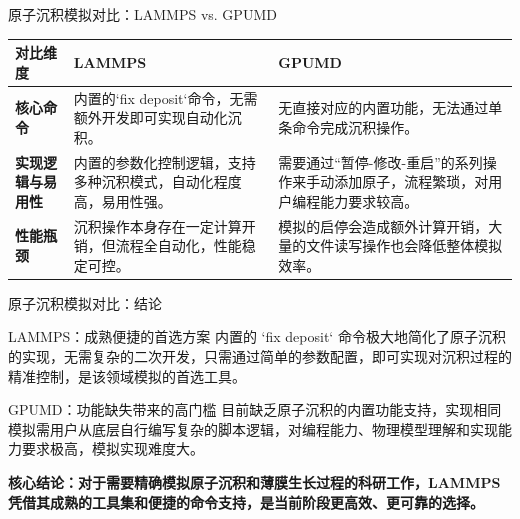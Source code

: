 \documentclass{beamer}
\begin{document}
\begin{frame}{原子沉积模拟对比：LAMMPS vs. GPUMD}
    \begin{tabular}{|l|l|l|}
        \hline
        \textbf{对比维度} & \textbf{LAMMPS} & \textbf{GPUMD} \\
        \hline
        \textbf{核心命令} & 内置的`fix deposit`命令，无需额外开发即可实现自动化沉积。 & 无直接对应的内置功能，无法通过单条命令完成沉积操作。 \\
        \hline
        \textbf{实现逻辑与易用性} & 内置的参数化控制逻辑，支持多种沉积模式，自动化程度高，易用性强。 & 需要通过“暂停-修改-重启”的系列操作来手动添加原子，流程繁琐，对用户编程能力要求较高。 \\
        \hline
        \textbf{性能瓶颈} & 沉积操作本身存在一定计算开销，但流程全自动化，性能稳定可控。 & 模拟的启停会造成额外计算开销，大量的文件读写操作也会降低整体模拟效率。 \\
        \hline
    \end{tabular}
\end{frame}

\begin{frame}{原子沉积模拟对比：结论}
    \begin{block}{LAMMPS：成熟便捷的首选方案}
        内置的 `fix deposit` 命令极大地简化了原子沉积的实现，无需复杂的二次开发，只需通过简单的参数配置，即可实现对沉积过程的精准控制，是该领域模拟的首选工具。
    \end{block}
    \begin{block}{GPUMD：功能缺失带来的高门槛}
        目前缺乏原子沉积的内置功能支持，实现相同模拟需用户从底层自行编写复杂的脚本逻辑，对编程能力、物理模型理解和实现能力要求极高，模拟实现难度大。
    \end{block}
    \textbf{核心结论：对于需要精确模拟原子沉积和薄膜生长过程的科研工作，LAMMPS凭借其成熟的工具集和便捷的命令支持，是当前阶段更高效、更可靠的选择。}
\end{frame}
\end{document}
